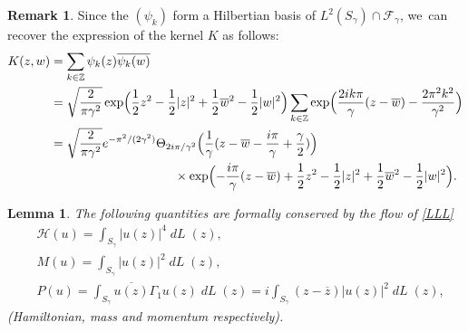 \documentclass[JEP,XML,SOM,Unicode,NoFloatCountersInSection,published]{cedram}
\DeclareMathOperator{\dL}{\mathit{dL}}
\newtheorem{lemme}[theorem]{Lemma}
\theoremstyle{definition}
\newtheorem{remark}[theorem]{Remark}
\let\e e
\let\EE\exp
\let\ov\overline
\newcommand\Z{\mathbb Z}
\begin{document}
\begin{remark}

Since the $(\psi_k)$ form a Hilbertian basis of $L^2(S_\gamma) \cap \mathcal{F}_\gamma$, we~can recover the expression of the kernel $K$ as follows:
\begin{align*}
K(z,w)&= \sum_{ k \in \Z } \psi_k(z)\ov{\psi_k(w)}\\
&= \sqrt{\frac{2}{\pi \gamma^2}} \EE\Bigl({\frac12z^2-\frac12|z|^2+\frac12\ov{w}^2-\frac12|w|^2}\Bigr) \sum_{ k \in \Z } \EE\Bigl({\frac{2ik\pi}{\gamma}(z-\ov{w}) -\frac{2\pi^2k^2}{\gamma^2}}\Bigr)\\
&=\sqrt{\frac{2}{\pi \gamma^2}} \e^{-{\pi^2}/{(2\gamma^2)}} \Theta_{{2i\pi}/{\gamma^2}}\Bigl(\frac{1}{\gamma}(z-\ov{w}-\frac{i\pi}{\gamma}+\frac{\gamma}{2})\Bigr) \\
&\hspace{3.5cm} \times \EE\Bigl({-\frac{i\pi}{\gamma}(z-\ov{w}) +\frac12z^2-\frac12|z|^2+\frac12\ov{w}^2-\frac12|w|^2}\Bigr).
\end{align*}
\end{remark}



\begin{lemme}\label{lem_conserv}
The following quantities are formally conserved by the flow of \eqref{LLL}
\begin{align*}
& \mathcal{H}(u) = \int_{S_{\gamma}}|u(z)|^{4} \dL(z), \\
& M(u) = \int_{S_{\gamma}}|u(z)|^{2}\dL(z), \\
& P(u) = \int_{S_{\gamma}}\ov{u(z)} \Gamma_1 u(z)\dL(z)= i \int_{S_{\gamma}}(z-\ov{z})|u(z)|^{2}\dL(z),
\end{align*}
(Hamiltonian, mass and momentum respectively).
\end{lemme}
\end{document}
